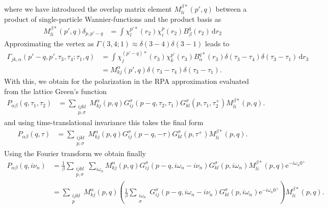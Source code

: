 \documentclass[12pt,a4paper]{scrartcl}
\numberwithin{equation}{section}
\begin{document}
where we have introduced the overlap matrix element $M^{\beta*}_{li}(p',q)$
between a product of single-particle Wannier-functions
and the product basis as
\begin{align}
M^{\beta*}_{li}(p',q) \delta_{p,p'-q}
&= \int \chi^{p'*}_{l}(r_2) \chi^p_{i}(r_2) B^{q}_{\beta}(r_2) \, \mathrm{d}r_2
\end{align}
Approximating the vertex as $\Gamma(3,4;1) \approx \delta(3-4)\delta(3-1)$
leads to
\begin{align}
\Gamma_{jk,\alpha}(p'-q,p',\tau_3,\tau_4;\tau_1,q)
&= \int \chi^{(p'-q)*}_{j}(r_3) \chi^{p'}_{k}(r_3)  B^{q*}_{\alpha}(r_3)
    \delta(\tau_3-\tau_4)\delta(\tau_3-\tau_1)\,\mathrm{d}r_3 \\
%
&= M^{\alpha}_{kj}(p',q) \delta(\tau_3-\tau_4)\delta(\tau_3-\tau_1).
\end{align}
With this, we obtain for the polarization in the RPA approximation
evaluated from the lattice Green's function
\begin{align}
 P_{\alpha\beta}(q,\tau_1,\tau_2)
%
&= \sum_{ \substack{ijkl\\p,\sigma}} 
     M^{\alpha}_{kj}(p,q)
      G^{\sigma}_{ij}(p-q,\tau_2,\tau_1) G^{\sigma}_{kl}(p,\tau_1,\tau_2^+)
     M^{\beta*}_{li}(p,q).
\end{align}
and using time-translational invariance this takes the final form
\begin{align}
 P_{\alpha\beta}(q,\tau)
%
&= \sum_{\substack{ijkl\\p,\sigma}} 
     M^{\alpha}_{kj}(p,q)
      G^{\sigma}_{ij}(p-q,-\tau) G^{\sigma}_{kl}(p,\tau^+)
     M^{\beta*}_{li}(p,q).
\end{align}
Using the Fourier transform we obtain finally
\begin{align}
 P_{\alpha\beta}(q,i\nu_n)
%
&=\frac{1}{\beta} \sum_{ \substack{ijkl\\p,\sigma}} \sum_{i\omega_n}
     M^{\alpha}_{kj}(p,q)
      G^{\sigma}_{ij}(p-q,i\omega_n-i\nu_n) G^{\sigma}_{kl}(p,i\omega_n)
     M^{\beta*}_{li}(p,q) \mathrm{e}^{-i\omega_n 0^+} \\
%
&=  \sum_{ \substack{ ijkl\\ p}} M^{\alpha}_{kj}(p,q)
    \left( \frac{1}{\beta}\sum_{\substack{i\omega_n\\ \sigma}} G^{\sigma}_{ij}(p-q,i\omega_n-i\nu_n) G^{\sigma}_{kl}(p,i\omega_n) \mathrm{e}^{-i\omega_n 0^+}  \right)
     M^{\beta*}_{li}(p,q) .\label{eq:final_pol_q_loc_basis}
\end{align}
\end{document}
